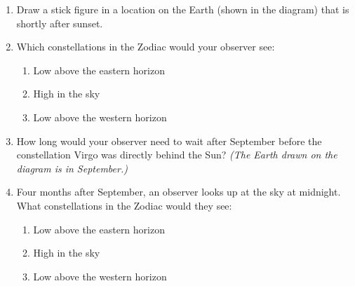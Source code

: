 \documentclass[12pt]{article}
\begin{document}
\begin{enumerate}
	\item Draw a stick figure in a location on the Earth (shown in the diagram) that is shortly after sunset.
	
	\item Which constellations in the Zodiac would your observer see:
	
	\begin{enumerate}
		\item Low above the eastern horizon
		\vspace{0.5in}
		
		\item High in the sky
				\vspace{0.5in}
		\item Low above the western horizon
				\vspace{0.5in}
	\end{enumerate}

\item How long would your observer need to wait after September before the constellation Virgo was directly behind the Sun? {\it (The Earth drawn on the diagram is in September.)}

\vspace{1in}

\item Four months after September, an observer looks up at the sky at midnight. What constellations in the Zodiac would they see:

\begin{enumerate}
	\item Low above the eastern horizon		\vspace{0.5in}
	\item High in the sky		\vspace{0.5in}
	\item Low above the western horizon
\end{enumerate}

	
	


\end{enumerate}
\end{document}
